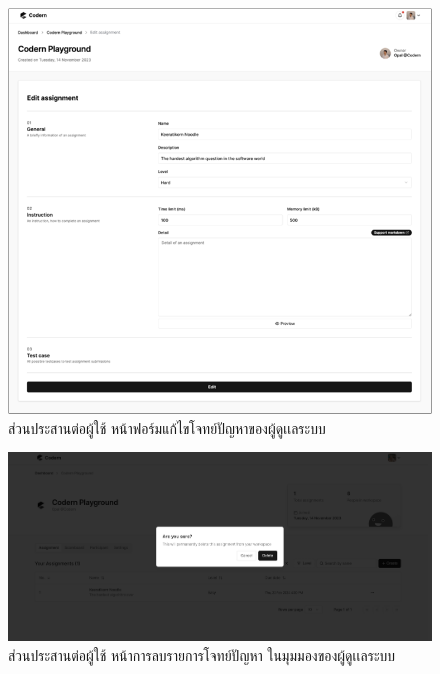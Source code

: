 \documentclass[12pt,one side,openright,a4paper]{cpe-thesis-th}
\begin{document}
\begin{figure}[H]
  \centering
  \includegraphics[width=15cm]{figure/new-ui/ui-assign6.png}
  \caption[ส่วนประสานต่อผู้ใช้ หน้าฟอร์มแก้ไขโจทย์ปัญหา]{ส่วนประสานต่อผู้ใช้ หน้าฟอร์มแก้ไขโจทย์ปัญหาของผู้ดูเเลระบบ}
  \label{fig:new-ui-assign6}
\end{figure}

\begin{figure}[H]
  \centering
  \includegraphics[width=15cm]{figure/new-ui/ui-assign7.png}
  \caption[ส่วนประสานต่อผู้ใช้ หน้าการลบรายการโจทย์ปัญหาของผู้ดูเเลระบบ]{ส่วนประสานต่อผู้ใช้ หน้าการลบรายการโจทย์ปัญหา ในมุมมองของผู้ดูเเลระบบ}
  \label{fig:new-ui-assign7}
\end{figure}

\pagebreak
{}
 \\
\end{document}
